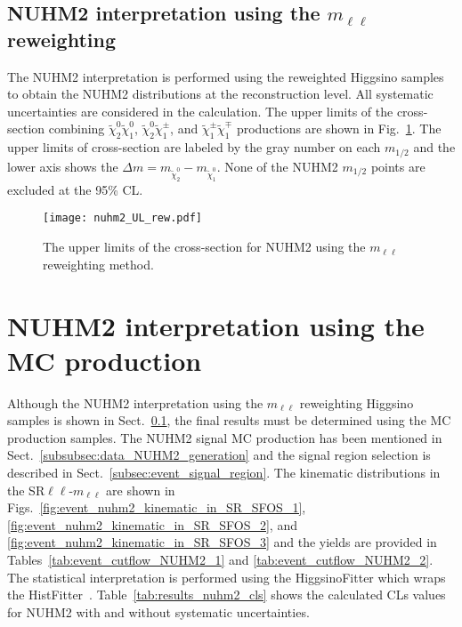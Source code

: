 
\subsection{NUHM2 interpretation using the $m_{\ell \ell}$ reweighting}
\label{subsec:results_mll_reweighting_interpretation}
The NUHM2 interpretation is performed using the reweighted Higgsino samples to obtain the NUHM2 distributions at the reconstruction level.
All systematic uncertainties are considered in the calculation.
The upper limits of the cross-section combining $\widetilde{\chi}^{0}_{2} \widetilde{\chi}^{0}_{1}$, $\widetilde{\chi}^{0}_{2} \widetilde{\chi}^{\pm}_{1}$, and $\widetilde{\chi}^{\pm}_{1} \widetilde{\chi}^{\mp}_{1}$ productions are shown in Fig.~\ref{fig:results_nuhm2_interpretation_reweighting}.
The upper limits of cross-section are labeled by the gray number on each $m_{1/2}$ and the lower axis shows the $\Delta m = m_{\widetilde{\chi}^{0}_{2}} - m_{\widetilde{\chi}^{0}_{1}}$.
None of the NUHM2 $m_{1/2}$ points are excluded at the 95\% CL.

\begin{figure}[htb]
    \begin{center}
        \texttt{[image: nuhm2\_UL\_rew.pdf]}
        \caption{The upper limits of the cross-section for NUHM2 using the $m_{\ell \ell}$ reweighting method.}
        \label{fig:results_nuhm2_interpretation_reweighting}
    \end{center}
\end{figure}


\section{NUHM2 interpretation using the MC production}
\label{sec:results_mc_production_interpretation}
Although the NUHM2 interpretation using the $m_{\ell \ell}$ reweighting Higgsino samples is shown in Sect.~\ref{subsec:results_mll_reweighting_interpretation}, the final results must be determined using the MC production samples.
The NUHM2 signal MC production has been mentioned in Sect.~\ref{subsubsec:data_NUHM2_generation} and the signal region selection is described in Sect.~\ref{subsec:event_signal_region}.
The kinematic distributions in the SR$\ell \ell$-$m_{\ell \ell}$ are shown in Figs.~\ref{fig:event_nuhm2_kinematic_in_SR_SFOS_1}, \ref{fig:event_nuhm2_kinematic_in_SR_SFOS_2}, and \ref{fig:event_nuhm2_kinematic_in_SR_SFOS_3} and the yields are provided in Tables~\ref{tab:event_cutflow_NUHM2_1} and \ref{tab:event_cutflow_NUHM2_2}.
The statistical interpretation is performed using the HiggsinoFitter which wraps the HistFitter~\cite{Baak:2014wma}.
Table~\ref{tab:results_nuhm2_cls} shows the calculated CLs values for NUHM2 with and without systematic uncertainties.

